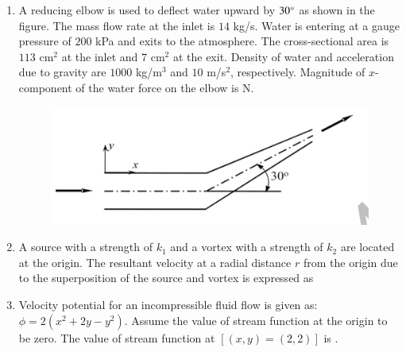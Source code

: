 \documentclass[a4paper,10pt]{article}
\begin{document}
\begin{enumerate}
    \hfill{}

    \item A reducing elbow is used to deflect water upward by $30\degree$ as shown in the figure. The mass flow rate at the inlet is $14$ kg/s. Water is entering at a gauge pressure of $200$ kPa and exits to the atmosphere. The cross-sectional area is $113$ cm$^2$ at the inlet and $7$ cm$^2$ at the exit. Density of water and acceleration due to gravity are $1000$ kg/m$^3$ and $10$ m/s$^2$, respectively. Magnitude of $x$-component of the water force on the elbow is \underline{\hspace{2cm}} N.
    \begin{figure}[H] \centering \includegraphics[width=0.6\columnwidth]{Bq15.png} \caption*{} \label{fig:q15_fluid} \end{figure}
    
    \hfill{}

    \item A source with a strength of $k_1$ and a vortex with a strength of $k_2$ are located at the origin. The resultant velocity at a radial distance $r$ from the origin due to the superposition of the source and vortex is expressed as
    
    \hfill{}
    \begin{enumerate}[label=\Alph*)]
    \end{enumerate}

    \item Velocity potential for an incompressible fluid flow is given as: $\phi = 2(x^2+2y-y^2)$. Assume the value of stream function at the origin to be zero. The value of stream function at $[(x,y) = (2,2)]$ is \underline{\hspace{2cm}}.
    

\end{enumerate}
\end{document}
